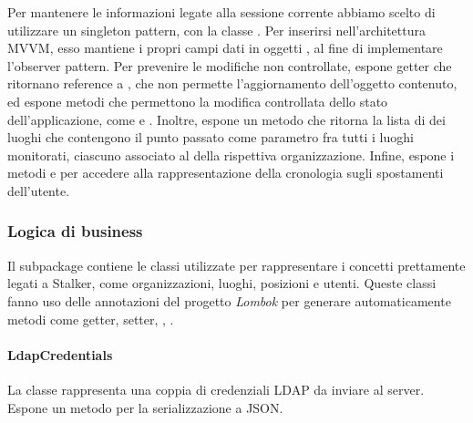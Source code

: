 \documentclass[../../manuale-manutentore.tex]{subfiles}
\begin{document}
Per mantenere le informazioni legate alla sessione corrente abbiamo scelto di utilizzare un singleton pattern, con la classe .
Per inserirsi nell'architettura MVVM, esso mantiene i propri campi dati in oggetti , al fine di implementare l'observer pattern.
Per prevenire le modifiche non controllate, espone getter che ritornano reference a , che non permette l'aggiornamento dell'oggetto contenuto, ed espone metodi che permettono la modifica controllata dello stato dell'applicazione, come  e \linebreak{}.
Inoltre, espone un metodo  che ritorna la lista di  dei luoghi che contengono il punto passato come parametro fra tutti i luoghi monitorati, ciascuno associato al  della rispettiva organizzazione.
Infine, espone i metodi \linebreak{} e  per accedere alla rappresentazione della cronologia sugli spostamenti dell'utente.

\subsubsection{Logica di business}%
\label{subs:logica_di_business}

Il subpackage  contiene le classi utilizzate per rappresentare i concetti prettamente legati a Stalker, come organizzazioni, luoghi, posizioni e utenti.
Queste classi fanno uso delle annotazioni del progetto \textit{Lombok} per generare automaticamente metodi come getter, setter, , .

\paragraph{LdapCredentials}%
\label{par:ldapcredentials}

La classe  rappresenta una coppia di credenziali LDAP da inviare al server.
Espone un metodo per la serializzazione a JSON\@.


\paragraph[Organization]{}%
\label{par:app/organization}
\end{document}
